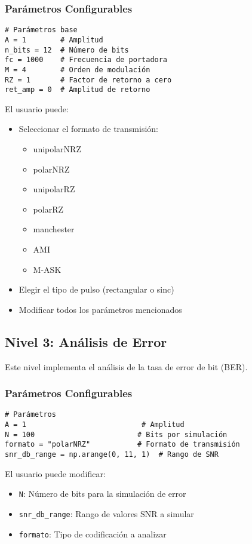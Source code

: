 \documentclass[12pt,a4paper]{article}
\begin{document}
\subsubsection{Parámetros Configurables}
\begin{lstlisting}[caption=Parámetros del Nivel 2]
# Parámetros base
A = 1        # Amplitud
n_bits = 12  # Número de bits
fc = 1000    # Frecuencia de portadora
M = 4        # Orden de modulación
RZ = 1       # Factor de retorno a cero
ret_amp = 0  # Amplitud de retorno
\end{lstlisting}

El usuario puede:
\begin{itemize}
    \item Seleccionar el formato de transmisión:
    \begin{itemize}
        \item unipolarNRZ
        \item polarNRZ
        \item unipolarRZ
        \item polarRZ
        \item manchester
        \item AMI
        \item M-ASK
    \end{itemize}
    \item Elegir el tipo de pulso (rectangular o sinc)
    \item Modificar todos los parámetros mencionados
\end{itemize}

\subsection{Nivel 3: Análisis de Error}
Este nivel implementa el análisis de la tasa de error de bit (BER).

\subsubsection{Parámetros Configurables}
\begin{lstlisting}[caption=Parámetros del Nivel 3]
# Parámetros
A = 1                           # Amplitud
N = 100                        # Bits por simulación
formato = "polarNRZ"           # Formato de transmisión
snr_db_range = np.arange(0, 11, 1)  # Rango de SNR
\end{lstlisting}

El usuario puede modificar:
\begin{itemize}
    \item \texttt{N}: Número de bits para la simulación de error
    \item \texttt{snr\_db\_range}: Rango de valores SNR a simular
    \item \texttt{formato}: Tipo de codificación a analizar
\end{itemize}
\end{document}
